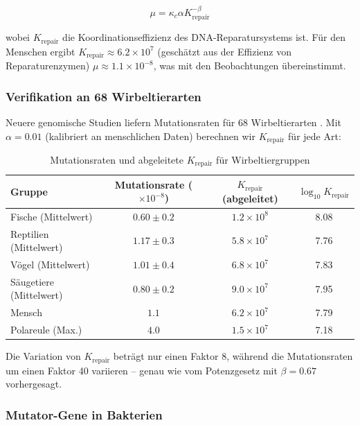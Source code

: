 \documentclass[12pt,a4paper]{article}
\theoremstyle{remark}
\newcommand{\kappac}{\kappa_c}
\begin{document}
	\begin{equation}
		\mu = \kappac \alpha K_{\text{repair}}^{-\beta}
		\label{eq:mutation-rate}
	\end{equation}
	
	wobei $K_{\text{repair}}$ die Koordinationseffizienz des DNA-Reparatursystems ist. Für den Menschen ergibt $K_{\text{repair}} \approx 6.2 \times 10^7$ (geschätzt aus der Effizienz von Reparaturenzymen) $\mu \approx 1.1 \times 10^{-8}$, was mit den Beobachtungen übereinstimmt.
	
	\subsubsection{Verifikation an 68 Wirbeltierarten}
	
	Neuere genomische Studien liefern Mutationsraten für 68 Wirbeltierarten \cite{Bergeron2023}. Mit $\alpha = 0.01$ (kalibriert an menschlichen Daten) berechnen wir $K_{\text{repair}}$ für jede Art:
	
	\begin{table}[htbp]
		\centering
		\caption{Mutationsraten und abgeleitete $K_{\text{repair}}$ für Wirbeltiergruppen \cite{Bergeron2023}}
		\label{tab:vertebrate-mutations}
		\small
		\begin{tabular}{lccc}
			\toprule
			\textbf{Gruppe} & \textbf{Mutationsrate ($\times 10^{-8}$)} & \textbf{$K_{\text{repair}}$ (abgeleitet)} & $\log_{10} K_{\text{repair}}$ \\
			\midrule
			Fische (Mittelwert) & $0.60 \pm 0.2$ & $1.2 \times 10^8$ & 8.08 \\
			Reptilien (Mittelwert) & $1.17 \pm 0.3$ & $5.8 \times 10^7$ & 7.76 \\
			Vögel (Mittelwert) & $1.01 \pm 0.4$ & $6.8 \times 10^7$ & 7.83 \\
			Säugetiere (Mittelwert) & $0.80 \pm 0.2$ & $9.0 \times 10^7$ & 7.95 \\
			Mensch & $1.1$ & $6.2 \times 10^7$ & 7.79 \\
			Polareule (Max.) & $4.0$ & $1.5 \times 10^7$ & 7.18 \\
			\bottomrule
		\end{tabular}
	\end{table}
	
	Die Variation von $K_{\text{repair}}$ beträgt nur einen Faktor 8, während die Mutationsraten um einen Faktor 40 variieren – genau wie vom Potenzgesetz mit $\beta = 0.67$ vorhergesagt.
	
	\subsubsection{Mutator-Gene in Bakterien}
	
\end{document}
